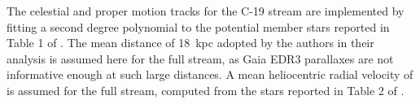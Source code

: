 The celestial and proper motion tracks for the C-19 stream are implemented by fitting a second degree polynomial to the potential member stars reported in Table 1 of \citet{Martin2022}. The mean distance of 18~kpc adopted by the authors in their analysis is assumed here for the full stream, as Gaia EDR3 parallaxes are not informative enough at such large distances. A mean heliocentric radial velocity of is assumed for the full stream, computed from the stars reported in Table 2 of \citet{Martin2022}. 

